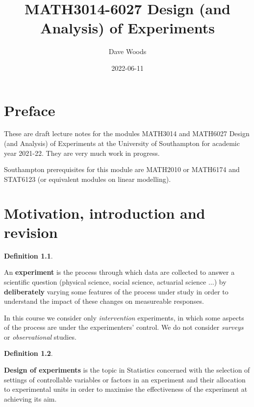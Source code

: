 \documentclass[
]{book}
\title{MATH3014-6027 Design (and Analysis) of Experiments}
\author{Dave Woods}
\date{2022-06-11}
\theoremstyle{definition}
\newtheorem{definition}{Definition}[chapter]
\theoremstyle{definition}
\theoremstyle{definition}
\theoremstyle{definition}
\theoremstyle{remark}
\begin{document}
\maketitle

{
\setcounter{tocdepth}{1}
\tableofcontents
}
\hypertarget{preface}{%
\chapter*{Preface}\label{preface}}

These are draft lecture notes for the modules MATH3014 and MATH6027 Design (and Analysis) of Experiments at the University of Southampton for academic year 2021-22. They are very much work in progress.

Southampton prerequisites for this module are MATH2010 or MATH6174 and STAT6123 (or equivalent modules on linear modelling).

\newcommand{\bx}{\boldsymbol{x}}
\newcommand{\btheta}{\boldsymbol{\theta}}
\newcommand{\bbeta}{\boldsymbol{\beta}}
\newcommand{\bvarepsilon}{\boldsymbol{\varepsilon}}
\newcommand{\by}{\boldsymbol{y}}
\newcommand{\rT}{\mathrm{T}}
\newcommand{\Var}{\operatorname{Var}}
\newcommand{\bY}{\boldsymbol{y}}
\newcommand{\btau}{\boldsymbol{\tau}}

\hypertarget{intro}{%
\chapter{Motivation, introduction and revision}\label{intro}}

\begin{definition}
\protect\hypertarget{def:exp}{}\label{def:exp}

An \textbf{experiment} is the process through which data are collected to answer a scientific question (physical science, social science, actuarial science \(\dots\)) by \textbf{deliberately} varying some features of the process under study in order to understand the impact of these changes on measureable responses.

In this course we consider only \emph{intervention} experiments, in which some aspects of the process are under the experimenters' control. We do not consider \emph{surveys} or \emph{observational} studies.

\end{definition}

\begin{definition}
\protect\hypertarget{def:design}{}\label{def:design}

\textbf{Design of experiments} is the topic in Statistics concerned with the selection of settings of controllable variables or factors in an experiment and their allocation to experimental units in order to maximise the effectiveness of the experiment at achieving its aim.

\end{definition}
\end{document}
